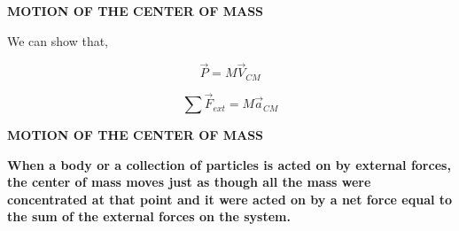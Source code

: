 \documentclass[]{beamer}
\begin{document}
\begin{frame}
    \textbf{MOTION OF THE CENTER OF MASS}
     \vspace{7mm}

  We can show that,
  
  
  \begin{equation}
      \vec{P}=M\vec{V}_{CM}
  \end{equation}



  \begin{equation}
    \sum \vec{F}_{ext}=M\vec{a}_{CM}
\end{equation}




     \end{frame}









\begin{frame}
    \textbf{MOTION OF THE CENTER OF MASS}
     \vspace{7mm}




\textbf{When a body or a collection of particles is acted on by external forces, the center
of mass moves just as though all the mass were concentrated at that point and it
were acted on by a net force equal to the sum of the external forces on the system.}
\vspace{7mm}



     \end{frame}

\end{document}

